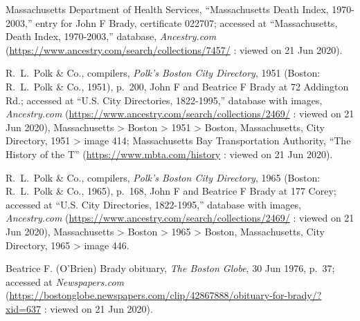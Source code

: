 \begin{thebibliography}{999}
Massachusetts Department of Health Services, ``Massachusetts Death Index, 1970-2003,'' entry for John F Brady, certificate 022707; accessed at ``Massachusetts, Death Index, 1970-2003,'' database, \textit{Ancestry.com} (\url{https://www.ancestry.com/search/collections/7457/} : viewed on 21 Jun 2020).

R.\ L.\ Polk \& Co., compilers, \textit{Polk's Boston City Directory}, 1951 (Boston: R.\ L.\ Polk \& Co., 1951), p.\ 200, John F and Beatrice F Brady at 72 Addington Rd.; accessed at ``U.S. City Directories, 1822-1995,'' database with images, \textit{Ancestry.com} (\url{https://www.ancestry.com/search/collections/2469/} : viewed on 21 Jun 2020), Massachusetts > Boston > 1951 > Boston, Massachusetts, City Directory, 1951 > image 414; Massachusetts Bay Transportation Authority, ``The History of the T'' (\url{https://www.mbta.com/history} : viewed on 21 Jun 2020).

R.\ L.\ Polk \& Co., compilers, \textit{Polk's Boston City Directory}, 1965 (Boston: R.\ L.\ Polk \& Co., 1965), p.\ 168, John F and Beatrice F Brady at 177 Corey; accessed at ``U.S. City Directories, 1822-1995,'' database with images, \textit{Ancestry.com} (\url{https://www.ancestry.com/search/collections/2469/} : viewed on 21 Jun 2020), Massachusetts > Boston > 1965 > Boston, Massachusetts, City Directory, 1965 > image 446.

Beatrice F. (O'Brien) Brady obituary, \textit{The Boston Globe}, 30 Jun 1976, p.\ 37; accessed at \textit{Newspapers.com} (\url{https://bostonglobe.newspapers.com/clip/42867888/obituary-for-brady/?xid=637} : viewed on 21 Jun 2020).
	
\end{thebibliography}